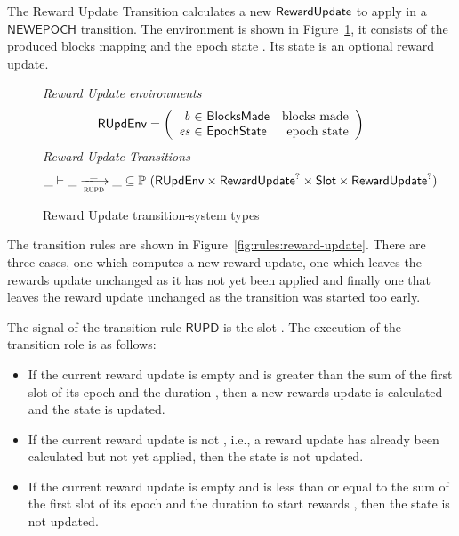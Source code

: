The Reward Update Transition calculates a new $\mathsf{RewardUpdate}$ to apply in a
$\mathsf{NEWEPOCH}$ transition. The environment is shown in
Figure~\ref{fig:ts-types:reward-update}, it consists of the produced blocks
mapping  and the epoch state . Its state is an optional reward
update.

\begin{figure}
  \emph{Reward Update environments}
  \begin{equation*}
    \RUpdEnv =
    \left(
      \begin{array}{r@{~\in~}lr}
        \var{b} & \BlocksMade & \text{blocks made} \\
        \var{es} & \EpochState & \text{epoch state} \\
      \end{array}
    \right)
  \end{equation*}
  \emph{Reward Update Transitions}
  \begin{equation*}
    \_ \vdash \var{\_} \trans{rupd}{\_} \var{\_} \subseteq
    \powerset (\RUpdEnv \times \RewardUpdate^? \times \Slot \times \RewardUpdate^?)
  \end{equation*}
  \caption{Reward Update transition-system types}
  \label{fig:ts-types:reward-update}
\end{figure}

The transition rules are shown in Figure~\ref{fig:rules:reward-update}. There
are three cases, one which computes a new reward update, one which leaves the
rewards update unchanged as it has not yet been applied and finally one that
leaves the reward update unchanged as the transition was started too early.

The signal of the transition rule $\mathsf{RUPD}$ is the slot . The
execution of the transition role is as follows:

\begin{itemize}
\item If the current reward update  is empty and  is greater than
  the sum of the first slot of its epoch and the duration \StabilityWindow, then a
  new rewards update is calculated and the state is updated.
\item If the current reward update  is not \Nothing, i.e., a reward
  update has already been calculated but not yet applied, then the state is not updated.
\item If the current reward update  is empty and  is less than or equal to the sum
  of the first slot of its epoch and the duration to start rewards \StabilityWindow,
  then the state is not updated.
\end{itemize}

